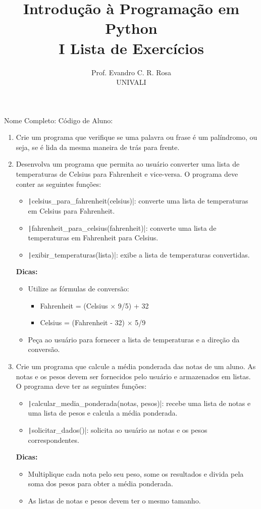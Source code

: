 \documentclass[12pt]{article}
\title{Introdução à Programação em Python\\
\large I Lista de Exercícios}
\author{Prof. Evandro C. R. Rosa\\UNIVALI}
\date{}
\begin{document}
\maketitle

\noindent Nome Completo: \underline{\hspace{8cm}} Código de Aluno: \underline{\hspace{2.4cm}}

\begin{enumerate}
  \item Crie um programa que verifique se uma palavra ou frase é um palíndromo, ou seja, se é lida da mesma maneira de trás para frente.

  \item Desenvolva um programa que permita ao usuário converter uma lista de temperaturas de Celsius para Fahrenheit e vice-versa. O programa deve conter as seguintes funções:
    \begin{itemize}
      \item \texttt|celsius_para_fahrenheit(celsius)|: converte uma lista de temperaturas em Celsius para Fahrenheit.
      \item \texttt|fahrenheit_para_celsius(fahrenheit)|: converte uma lista de temperaturas em Fahrenheit para Celsius.
      \item \texttt|exibir_temperaturas(lista)|: exibe a lista de temperaturas convertidas.
    \end{itemize}
    \textbf{Dicas:}
    \begin{itemize}
      \item Utilize as fórmulas de conversão:
        \begin{itemize}
          \item Fahrenheit = (Celsius $\times$ 9/5) + 32
          \item Celsius = (Fahrenheit - 32) $\times$ 5/9
        \end{itemize}
      \item Peça ao usuário para fornecer a lista de temperaturas e a direção da conversão.
    \end{itemize}

  \item Crie um programa que calcule a média ponderada das notas de um aluno. As notas e os pesos devem ser fornecidos pelo usuário e armazenados em listas. O programa deve ter as seguintes funções:
    \begin{itemize}
      \item \texttt|calcular_media_ponderada(notas, pesos)|: recebe uma lista de notas e uma lista de pesos e calcula a média ponderada.
      \item \texttt|solicitar_dados()|: solicita ao usuário as notas e os pesos correspondentes.
    \end{itemize}
    \textbf{Dicas:}
    \begin{itemize}
      \item Multiplique cada nota pelo seu peso, some os resultados e divida pela soma dos pesos para obter a média ponderada.
      \item As listas de notas e pesos devem ter o mesmo tamanho.
    \end{itemize}


\end{enumerate}
\end{document}
